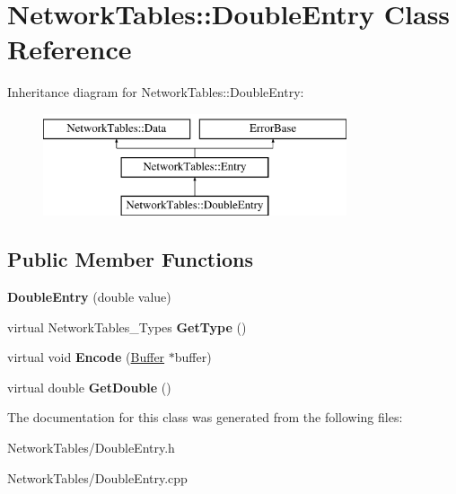 \hypertarget{classNetworkTables_1_1DoubleEntry}{
\section{NetworkTables::DoubleEntry Class Reference}
\label{classNetworkTables_1_1DoubleEntry}
}
Inheritance diagram for NetworkTables::DoubleEntry:\begin{figure}[H]
\begin{center}
\leavevmode
\includegraphics[height=3.000000cm]{classNetworkTables_1_1DoubleEntry}
\end{center}
\end{figure}
\subsection*{Public Member Functions}
\begin{DoxyCompactItemize}
\item 
\hypertarget{classNetworkTables_1_1DoubleEntry_a8ed6c714bf73eea9f2b2eb956d34e9f8}{
{\bfseries DoubleEntry} (double value)}
\label{classNetworkTables_1_1DoubleEntry_a8ed6c714bf73eea9f2b2eb956d34e9f8}

\item 
\hypertarget{classNetworkTables_1_1DoubleEntry_a8582fc498723355a096ebed027e4af1f}{
virtual NetworkTables\_\-Types {\bfseries GetType} ()}
\label{classNetworkTables_1_1DoubleEntry_a8582fc498723355a096ebed027e4af1f}

\item 
\hypertarget{classNetworkTables_1_1DoubleEntry_aad332a5184c24ef1403afcedab534893}{
virtual void {\bfseries Encode} (\hyperlink{classNetworkTables_1_1Buffer}{Buffer} $\ast$buffer)}
\label{classNetworkTables_1_1DoubleEntry_aad332a5184c24ef1403afcedab534893}

\item 
\hypertarget{classNetworkTables_1_1DoubleEntry_abbc126285fca6b358f2ea39c3856fa6b}{
virtual double {\bfseries GetDouble} ()}
\label{classNetworkTables_1_1DoubleEntry_abbc126285fca6b358f2ea39c3856fa6b}

\end{DoxyCompactItemize}


The documentation for this class was generated from the following files:\begin{DoxyCompactItemize}
\item 
NetworkTables/DoubleEntry.h\item 
NetworkTables/DoubleEntry.cpp\end{DoxyCompactItemize}
